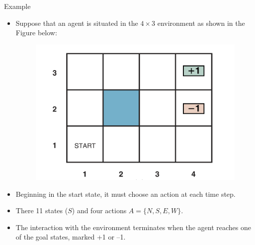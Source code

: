 \documentclass[handout]{beamer}
\begin{document}
\begin{frame}{Example}
\scriptsize{
\begin{itemize}
\item Suppose that an agent is situated in the $4\times 3$ environment as shown in the Figure below: 


  \begin{figure}[h]
        	\includegraphics[scale = 0.4]{pics/example.png}
        \end{figure}

\item Beginning in the start state, it must choose an action at each time step. 

\item There 11 states ($S$) and four actions $A=\{N,S,E,W\}$.

\item The interaction with the environment terminates when the agent reaches one of the goal states, marked +1 or –1.

\end{itemize}


} 

\end{frame}
\end{document}
